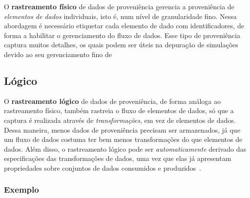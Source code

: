 O \textbf{rastreamento físico} de dados de proveniência gerencia a proveniência de \emph{elementos de dados} individuais, isto é, num nível de granularidade fino. Nessa abordagem é necessário etiquetar cada elemento de dado com identificadores, de forma a habilitar o gerenciamento do fluxo de dados. Esse tipo de proveniência captura muitos detalhes, os quais podem ser úteis na depuração de simulações devido ao seu gerenciamento fino de 

\subsection{Lógico}

O \textbf{rastreamento lógico} de dados de proveniência, de forma análoga ao rastreamento físico, também rastreia o fluxo de elementos de dados, só que a captura é realizada através de \emph{transformações}, em vez de elementos de dados. Dessa maneira, menos dados de proveniência precisam ser armazenados, já que um fluxo de dados costuma ter bem menos transformações do que elementos de dados. Além disso, o rastreamento lógico pode ser \emph{automaticamente} derivado das especificações das transformações de dados, uma vez que elas já apresentam propriedades sobre conjuntos de dados consumidos e produzidos~\cite{ikeda2013logical}.


\subsubsection{Exemplo}


